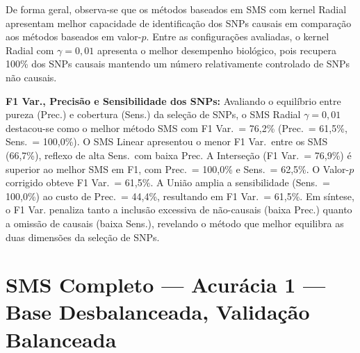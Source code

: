\documentclass[
    12pt,
    a4paper,
    oneside,
    english,
    french,
    spanish,
    brazil
    ]{abntex2}
\newcommand{\novo}[1]{\textcolor{corNova}{#1}}
\begin{document}
De forma geral, observa-se que os métodos baseados em SMS com kernel Radial apresentam melhor capacidade de identificação dos SNPs causais em comparação aos métodos baseados em valor-$p$. Entre as configurações avaliadas, o kernel Radial com $\gamma = 0{,}01$ apresenta o melhor desempenho biológico, pois recupera 100\% dos SNPs causais mantendo um número relativamente controlado de SNPs não causais.


\novo{\textbf{F1 Var., Precisão e Sensibilidade dos SNPs:} Avaliando o equilíbrio entre pureza (Prec.) e cobertura (Sens.) da seleção de SNPs, o SMS Radial $\gamma=0{,}01$ destacou-se como o melhor método SMS com F1 Var.\ = 76,2\% (Prec.\ = 61,5\%, Sens.\ = 100,0\%). O SMS Linear apresentou o menor F1 Var.\ entre os SMS (66,7\%), reflexo de alta Sens.\ com baixa Prec. A Interseção (F1 Var.\ = 76,9\%) é superior ao melhor SMS em F1, com Prec.\ = 100,0\% e Sens.\ = 62,5\%. O Valor-$p$ corrigido obteve F1 Var.\ = 61,5\%. A União amplia a sensibilidade (Sens.\ = 100,0\%) ao custo de Prec.\ = 44,4\%, resultando em F1 Var.\ = 61,5\%. Em síntese, o F1 Var. penaliza tanto a inclusão excessiva de não-causais (baixa Prec.) quanto a omissão de causais (baixa Sens.), revelando o método que melhor equilibra as duas dimensões da seleção de SNPs.}
\section{SMS Completo --- Acurácia 1 --- Base Desbalanceada, Validação Balanceada}
\end{document}
